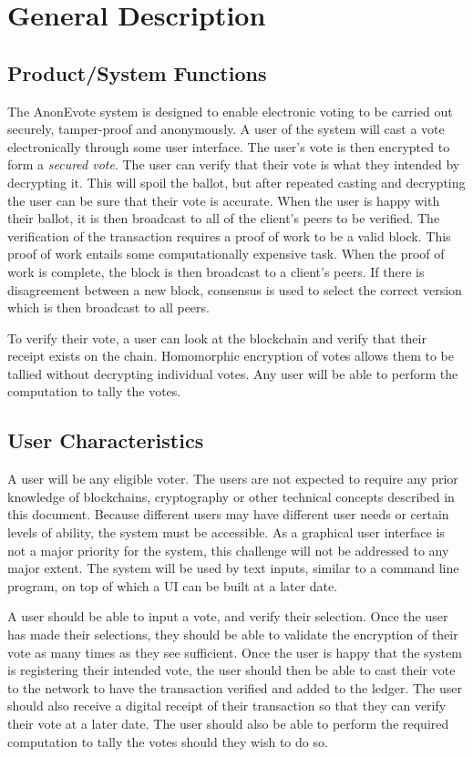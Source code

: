 \documentclass[a4paper,12pt]{article}
\newcommand{\proj}{AnonEvote}
\begin{document}
\section{General Description}
\subsection{Product/System Functions}
The \proj{} system is designed to enable electronic voting to be carried out securely, tamper-proof and anonymously. A user of the system will cast a vote electronically through some user interface. The user's vote is then encrypted to form a \textit{secured vote}. The user can verify that their vote is what they intended by decrypting it. This will spoil the ballot, but after repeated casting and decrypting the user can be sure that their vote is accurate. When the user is happy with their ballot, it is then broadcast to all of the client's peers to be verified. The verification of the transaction requires a proof of work to be a valid block. This proof of work entails some computationally expensive task. When the proof of work is complete, the block is then broadcast to a client's peers. If there is disagreement between a new block, consensus is used to select the correct version which is then broadcast to all peers.

To verify their vote, a user can look at the blockchain and verify that their receipt exists on the chain. Homomorphic encryption of votes allows them to be tallied without decrypting individual votes. Any user will be able to perform the computation to tally the votes.

\subsection{User Characteristics}
A user will be any eligible voter. The users are not expected to require any prior knowledge of blockchains, cryptography or other technical concepts described in this document. Because different users may have different user needs or certain levels of ability, the system must be accessible. As a graphical user interface is not a major priority for the system, this challenge will not be addressed to any major extent. The system will be used by text inputs, similar to a command line program, on top of which a UI can be built at a later date.

A user should be able to input a vote, and verify their selection. Once the user has made their selections, they should be able to validate the encryption of their vote as many times as they see sufficient. Once the user is happy that the system is registering their intended vote, the user should then be able to cast their vote to the network to have the transaction verified and added to the ledger. The user should also receive a digital receipt of their transaction so that they can verify their vote at a later date. The user should also be able to perform the required computation to tally the votes should they wish to do so.
\end{document}
